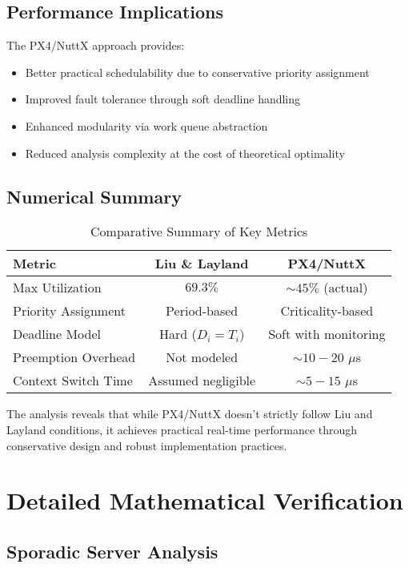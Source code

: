 \documentclass[12pt,a4paper]{article}
\begin{document}
\subsection{Performance Implications}

The PX4/NuttX approach provides:
\begin{itemize}
\item Better practical schedulability due to conservative priority assignment
\item Improved fault tolerance through soft deadline handling
\item Enhanced modularity via work queue abstraction
\item Reduced analysis complexity at the cost of theoretical optimality
\end{itemize}

\subsection{Numerical Summary}

\begin{table}[H]
\centering
\begin{tabular}{|l|c|c|}
\hline
\textbf{Metric} & \textbf{Liu \& Layland} & \textbf{PX4/NuttX} \\
\hline
Max Utilization & $69.3\%$ & $\sim 45\%$ (actual) \\
Priority Assignment & Period-based & Criticality-based \\
Deadline Model & Hard ($D_i = T_i$) & Soft with monitoring \\
Preemption Overhead & Not modeled & $\sim 10-20$ $\mu$s \\
Context Switch Time & Assumed negligible & $\sim 5-15$ $\mu$s \\
\hline
\end{tabular}
\caption{Comparative Summary of Key Metrics}
\end{table}

The analysis reveals that while PX4/NuttX doesn't strictly follow Liu and Layland conditions, it achieves practical real-time performance through conservative design and robust implementation practices.

\section{Detailed Mathematical Verification}

\subsection{Sporadic Server Analysis}
\end{document}

